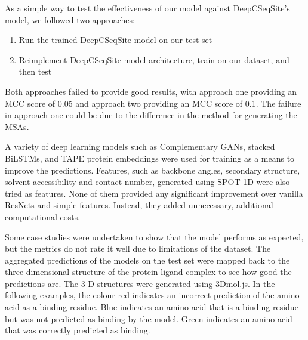 \documentclass[journal=jacsat,manuscript=article]{achemso}
\begin{document}
As a simple way to test the effectiveness of our model against DeepCSeqSite's model, we followed two approaches:
\begin{enumerate}
    \item Run the trained DeepCSeqSite model on our test set
    \item Reimplement DeepCSeqSite model architecture, train on our dataset, and then test
\end{enumerate}

Both approaches failed to provide good results, with approach one providing an MCC score of 0.05 and approach two providing an MCC score of 0.1. The failure in approach one could be due to the difference in the method for generating the MSAs.

A variety of deep learning models such as Complementary GANs, stacked BiLSTMs, and TAPE protein embeddings were used for training as a means to improve the predictions. Features, such as backbone angles, secondary structure, solvent accessibility and contact number, generated using SPOT-1D \cite{hanson2018accurate} were also tried as features. None of them provided any significant improvement over vanilla ResNets and simple features. Instead, they added unnecessary, additional computational costs.








\quad Some case studies were undertaken to show that the model performs as expected, but the metrics do not rate it well due to limitations of the dataset. The aggregated predictions of the models on the test set were mapped back to the three-dimensional structure of the protein-ligand complex to see how good the predictions are. The 3-D structures were generated using 3Dmol.js\cite{rego20153dmol}. In the following examples, the colour red indicates an incorrect prediction of the amino acid as a binding residue. Blue indicates an amino acid that is a binding residue but was not predicted as binding by the model. Green indicates an amino acid that was correctly predicted as binding.
\end{document}
